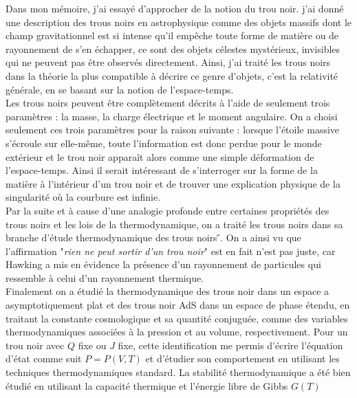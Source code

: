 \documentclass[11pt, a4paper]{awesome-cv}
\begin{document}
	
	
	
	\makelettertitle
	
	
	
	
	\begin{cvletter}
\vspace{2ex}
Dans mon mémoire, j'ai essayé d'approcher de la notion du trou noir. j'ai donné une description des trous noirs en astrophysique comme des objets massifs dont le champ gravitationnel est si intense qu'il empêche toute forme de matière ou de rayonnement de s'en échapper, ce sont des objets célestes mystérieux, invisibles qui ne peuvent pas être observés directement. Ainsi, j'ai traité les trous noirs dans la théorie la plus compatible à décrire ce genre d'objets, c'est la relativité générale, en se basant sur la notion de l'espace-temps. \\
Les trous noirs peuvent être complètement décrits à l'aide de seulement trois paramètres : la masse, la charge électrique et le moment angulaire. On a choisi seulement ces trois paramètres pour la raison suivante : lorsque l'étoile massive s'écroule sur elle-même, toute l'information est donc perdue pour le monde extérieur et le trou noir apparaît alors comme une simple déformation de l'espace-temps. Ainsi il serait intéressant de s'interroger sur la forme de la matière à l'intérieur d'un trou noir et de trouver une explication physique de la singularité où la courbure est infinie. \\
Par la suite et à cause d'une analogie profonde entre certaines propriétés des trous noirs et les lois de la thermodynamique, on a traité les trous noirs dans sa branche d'étude thermodynamique des trous noirs ̋. On a ainsi vu que l'affirmation "\textit{rien ne peut sortir d'un trou noir}" est en fait n'est pas juste, car Hawking a mis en évidence la présence d'un rayonnement de particules qui ressemble à celui d'un rayonnement thermique.  \\
Finalement on a étudié la thermodynamique des trous noir dans un espace a asymptotiquement plat et des trous noir AdS  dans un espace de phase étendu, en traitant la constante cosmologique et sa quantité conjuguée, comme des variables thermodynamiques associées à la pression et au volume, respectivement. Pour un trou noir avec $Q$ fixe ou $J$ fixe, cette identification me permis d'écrire l'équation d'état comme suit $P = P (V, T)$ et d'étudier son comportement en utilisant les techniques thermodynamiques standard. La stabilité thermodynamique a été bien étudié en utilisant la capacité thermique et l'énergie libre de Gibbs $G(T)$
	
	\end{cvletter}
	
	
	
	
\end{document}

